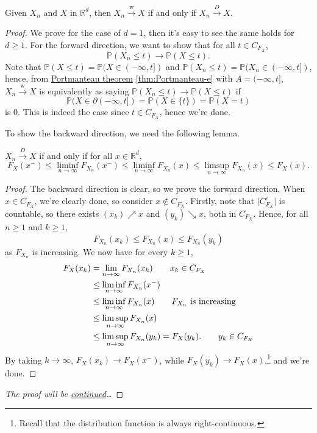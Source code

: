 \begin{theorem}\label{thm:weak-convergence-is-convergence-in-distribution}
	Given \(X_n\) and \(X\) in \(\mathbb{R} ^d\), then \(X_n \overset{\text{w} }{\to } X\) if and only if \(X_n \overset{D}{\to } X\).
\end{theorem}
\begin{proof}\let\qed\relax
	We prove for the case of \(d = 1\), then it's easy to see the same holds for \(d \geq 1\). For the forward direction, we want to show that for all \(t \in C_{F_X}\),
	\[
		\mathbb{P} (X_n \leq t) \to \mathbb{P} (X \leq t).
	\]
	Note that \(\mathbb{P} (X \leq t) = \mathbb{P} (X \in (-\infty , t])\) and \(\mathbb{P} (X_n \leq t) = \mathbb{P} (X_n \in (-\infty , t])\), hence, from \hyperref[thm:Portmanteau]{Portmanteau theorem} \autoref{thm:Portmanteau-e} with \(A = (-\infty , t]\), \(X_n \overset{\text{w} }{\to } X\) is equivalently as saying \(\mathbb{P} (X_n \leq t) \to \mathbb{P} (X \leq t)\) if
	\[
		\mathbb{P} (X \in \partial (-\infty , t])
		= \mathbb{P} (X \in \{ t \} )
		= \mathbb{P} (X = t)
	\]
	is \(0\). This is indeed the case since \(t \in C_{F_X}\), hence we're done.

	To show the backward direction, we need the following lemma.
	\begin{lemma}\label{lma:lec5}
		\(X_n \overset{D}{\to } X\) if and only if for all \(x \in \mathbb{R} ^d\),
		\[
			F_X(x^-)
			\leq \liminf_{n \to \infty} F_{X_n} (x^-)
			\leq \liminf_{n \to \infty} F_{X_n} (x)
			\leq \limsup_{n \to \infty} F_{X_n} (x)
			\leq F_X(x).
		\]
	\end{lemma}
	\begin{proof}
		The backward direction is clear, so we prove the forward direction. When \(x\in C_{F_X}\), we're clearly done, so consider \(x \notin C_{F_X}\). Firstly, note that \(\vert C_{F_X}^{c} \vert \) is countable, so there exists \((x_k) \nearrow x\) and \((y_k) \searrow x\), both in \(C_{F_X}\). Hence, for all \(n \geq 1\) and \(k \geq 1\),
		\[
			F_{X_n}(x_k)
			\leq F_{X_n}(x)
			\leq F_{X_n}(y_k)
		\]
		as \(F_{X_n}\) is increasing. We now have for every \(k \geq 1\),
		\begin{align*}
			F_X(x_k)
			 & = \lim_{n \to \infty} F_{X_n}(x_k) \tag*{\(x_k \in C_{F_X}\)}           \\
			 & \leq \liminf_{n \to \infty} F_{X_n}(x^-)                                \\
			 & \leq \liminf_{n \to \infty} F_{X_n}(x) \tag*{\(F_{X_n}\) is increasing} \\
			 & \leq \limsup_{n \to \infty} F_{X_n}(x)                                  \\
			 & \leq \limsup_{n \to \infty} F_{X_n}(y_k)
			= F_X(y_k). \tag*{\(y_k \in C_{F_X}\)}
		\end{align*}
		By taking \(k \to \infty \), \(F_X(x_k) \to F_X(x^-)\), while \(F_X(y_k) \to F_X(x)\),\footnote{Recall that the distribution function is always right-continuous.} and we're done.
	\end{proof}
	\emph{The proof will be \hyperref[pf:thm:weak-convergence-is-convergence-in-distribution]{continued}\dots}
\end{proof}